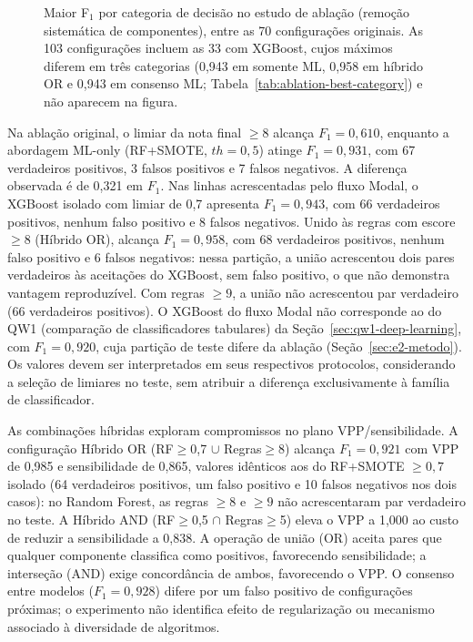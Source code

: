 \begin{figure}[!ht]
\centering

\caption{Maior F$_1$ por categoria de decisão no estudo de ablação (remoção sistemática de componentes), entre as 70 configurações originais. As 103 configurações incluem as 33 com XGBoost, cujos máximos diferem em três categorias (0,943 em somente ML, 0,958 em híbrido OR e 0,943 em consenso ML; Tabela~\ref{tab:ablation-best-category}) e não aparecem na figura.}
\label{fig:ablation-barplot}
\end{figure}

Na ablação original, o limiar da nota final $\geq 8$ alcança $F_1 = 0{,}610$, enquanto a abordagem ML-only (RF+SMOTE, $th = 0{,}5$) atinge $F_1 = 0{,}931$, com 67 verdadeiros positivos, 3 falsos positivos e 7 falsos negativos. A diferença observada é de 0,321 em $F_1$. Nas linhas acrescentadas pelo fluxo Modal, o XGBoost isolado com limiar de 0,7 apresenta $F_1 = 0{,}943$, com 66 verdadeiros positivos, nenhum falso positivo e 8 falsos negativos. Unido às regras com escore $\geq 8$ (Híbrido OR), alcança $F_1 = 0{,}958$, com 68 verdadeiros positivos, nenhum falso positivo e 6 falsos negativos: nessa partição, a união acrescentou dois pares verdadeiros às aceitações do XGBoost, sem falso positivo, o que não demonstra vantagem reproduzível. Com regras $\geq 9$, a união não acrescentou par verdadeiro (66 verdadeiros positivos). O XGBoost do fluxo Modal não corresponde ao do QW1 (comparação de classificadores tabulares) da Seção~\ref{sec:qw1-deep-learning}, com $F_1 = 0{,}920$, cuja partição de teste difere da ablação (Seção~\ref{sec:e2-metodo}). Os valores devem ser interpretados em seus respectivos protocolos, considerando a seleção de limiares no teste, sem atribuir a diferença exclusivamente à família de classificador.

As combinações híbridas exploram compromissos no plano VPP/sensibilidade. A configuração Híbrido OR (RF$\geq$0,7 $\cup$ Regras$\geq$8) alcança $F_1 = 0{,}921$ com VPP de 0,985 e sensibilidade de 0,865, valores idênticos aos do RF+SMOTE $\geq 0{,}7$ isolado (64 verdadeiros positivos, um falso positivo e 10 falsos negativos nos dois casos): no Random Forest, as regras $\geq 8$ e $\geq 9$ não acrescentaram par verdadeiro no teste. A Híbrido AND (RF$\geq$0,5 $\cap$ Regras$\geq$5) eleva o VPP a 1,000 ao custo de reduzir a sensibilidade a 0,838. A operação de união (OR) aceita pares que qualquer componente classifica como positivos, favorecendo sensibilidade; a interseção (AND) exige concordância de ambos, favorecendo o VPP. O consenso entre modelos ($F_1 = 0{,}928$) difere por um falso positivo de configurações próximas; o experimento não identifica efeito de regularização ou mecanismo associado à diversidade de algoritmos.

